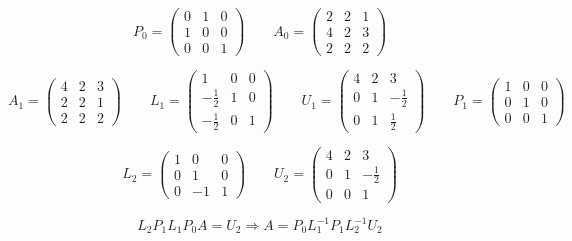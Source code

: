 \documentclass[10pt,a4paper]{article}
\begin{document}
\begin{equation*}
  P_{0} = \begin{pmatrix}
    0 & 1 & 0\\
    1 & 0 & 0\\
    0 & 0 & 1
  \end{pmatrix}
  \qquad
  A_{0} = \begin{pmatrix}
    2 & 2 & 1\\
    4 & 2 & 3\\
    2 & 2 & 2
  \end{pmatrix}
\end{equation*}

\begin{equation*}
  A_{1} = \begin{pmatrix}
    4 & 2 & 3\\
    2 & 2 & 1\\
    2 & 2 & 2
  \end{pmatrix}
  \qquad
  L_{1} = \begin{pmatrix}
    1 & 0 & 0\\
    -\frac{1}{2} & 1 & 0\\
    -\frac{1}{2} & 0 & 1
  \end{pmatrix}
  \qquad
  U_{1} = \begin{pmatrix}
    4 & 2 & 3\\
    0 & 1 & -\frac{1}{2}\\
    0 & 1 & \frac{1}{2}
  \end{pmatrix}
  \qquad
  P_{1} = \begin{pmatrix}
    1 & 0 & 0\\
    0 & 1 & 0\\
    0 & 0 & 1
  \end{pmatrix}
\end{equation*}

\begin{equation*}
  L_{2} = \begin{pmatrix}
    1 & 0 & 0\\
    0 & 1 & 0\\
    0 & -1 & 1
  \end{pmatrix}
  \qquad
  U_{2} = \begin{pmatrix}
    4 & 2 & 3\\
    0 & 1 & -\frac{1}{2}\\
    0 & 0 & 1
  \end{pmatrix}
\end{equation*}

\begin{equation*}
  L_{2}P_{1}L_{1}P_{0}A = U_{2} \Rightarrow A = P_{0}L_{1}^{-1}P_{1}L_{2}^{-1}U_{2}
\end{equation*}
\end{document}
